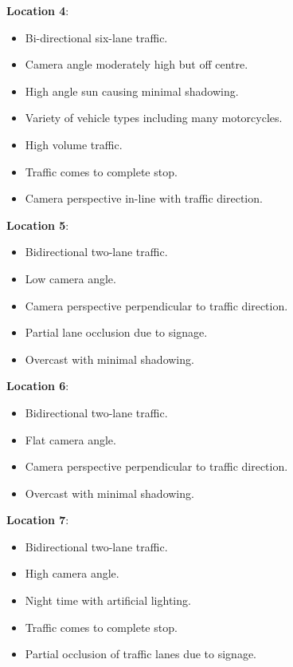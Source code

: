 \textbf{Location 4}:

\begin{itemize}
    \item Bi-directional six-lane traffic.
    \item Camera angle moderately high but off centre.
    \item High angle sun causing minimal shadowing.
    \item Variety of vehicle types including many motorcycles.
    \item High volume traffic.
    \item Traffic comes to complete stop.
    \item Camera perspective in-line with traffic direction.
\end{itemize}


\textbf{Location 5}:

\begin{itemize}
    \item Bidirectional two-lane traffic.
    \item Low camera angle.
    \item Camera perspective perpendicular to traffic direction.
    \item Partial lane occlusion due to signage.
    \item Overcast with minimal shadowing.
\end{itemize}


\textbf{Location 6}:

\begin{itemize}
    \item Bidirectional two-lane traffic.
    \item Flat camera angle.
    \item Camera perspective perpendicular to traffic direction.
    \item Overcast with minimal shadowing.
\end{itemize}

\textbf{Location 7}:

\begin{itemize}
    \item Bidirectional two-lane traffic.
    \item High camera angle.
    \item Night time with artificial lighting.
    \item Traffic comes to complete stop.
    \item Partial occlusion of traffic lanes due to signage.
\end{itemize}


